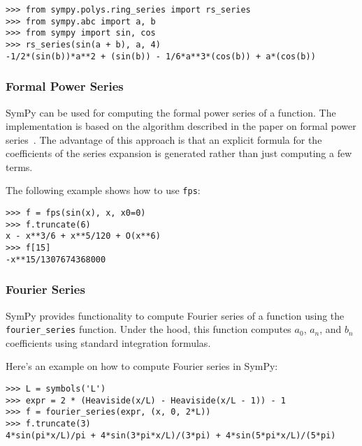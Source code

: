 \begin{verbatim}
>>> from sympy.polys.ring_series import rs_series
>>> from sympy.abc import a, b
>>> from sympy import sin, cos
>>> rs_series(sin(a + b), a, 4)
-1/2*(sin(b))*a**2 + (sin(b)) - 1/6*a**3*(cos(b)) + a*(cos(b))
\end{verbatim}

\subsubsection{Formal Power Series}

SymPy can be used for computing the formal power series of a function.
The implementation is based on the algorithm described in the paper on
formal power series~\cite{Gruntz93formalpower}.  The advantage of this approach is
that an explicit formula for the coefficients of the series expansion is generated
rather than just computing a few terms.

The following example shows how to use \texttt{fps}:

\begin{verbatim}
>>> f = fps(sin(x), x, x0=0)
>>> f.truncate(6)
x - x**3/6 + x**5/120 + O(x**6)
>>> f[15]
-x**15/1307674368000
\end{verbatim}

\subsubsection{Fourier Series}

SymPy provides functionality to compute Fourier series of a function using the
\texttt{fourier\_series} function. Under the hood, this function computes $a_0$,
$a_n$, and $b_n$ coefficients using standard integration formulas.

Here's an example on how to compute Fourier series in SymPy:

\begin{verbatim}
>>> L = symbols('L')
>>> expr = 2 * (Heaviside(x/L) - Heaviside(x/L - 1)) - 1
>>> f = fourier_series(expr, (x, 0, 2*L))
>>> f.truncate(3)
4*sin(pi*x/L)/pi + 4*sin(3*pi*x/L)/(3*pi) + 4*sin(5*pi*x/L)/(5*pi)
\end{verbatim}
